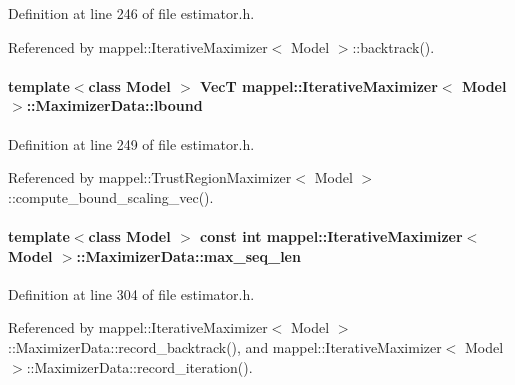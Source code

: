 Definition at line 246 of file estimator.\+h.



Referenced by mappel\+::\+Iterative\+Maximizer$<$ Model $>$\+::backtrack().

\paragraph[{\texorpdfstring{lbound}{lbound}}]{\setlength{\rightskip}{0pt plus 5cm}template$<$class Model $>$ {\bf VecT} {\bf mappel\+::\+Iterative\+Maximizer}$<$ Model $>$\+::Maximizer\+Data\+::lbound}\hypertarget{classmappel_1_1IterativeMaximizer_1_1MaximizerData_aead80fc0e12236ca355849ad36749094}{}\label{classmappel_1_1IterativeMaximizer_1_1MaximizerData_aead80fc0e12236ca355849ad36749094}


Definition at line 249 of file estimator.\+h.



Referenced by mappel\+::\+Trust\+Region\+Maximizer$<$ Model $>$\+::compute\+\_\+bound\+\_\+scaling\+\_\+vec().

\paragraph[{\texorpdfstring{max\+\_\+seq\+\_\+len}{max_seq_len}}]{\setlength{\rightskip}{0pt plus 5cm}template$<$class Model $>$ const int {\bf mappel\+::\+Iterative\+Maximizer}$<$ Model $>$\+::Maximizer\+Data\+::max\+\_\+seq\+\_\+len\hspace{0.3cm}{\ttfamily [protected]}}\hypertarget{classmappel_1_1IterativeMaximizer_1_1MaximizerData_aee106ddaebe30496f5280095fc01301a}{}\label{classmappel_1_1IterativeMaximizer_1_1MaximizerData_aee106ddaebe30496f5280095fc01301a}


Definition at line 304 of file estimator.\+h.



Referenced by mappel\+::\+Iterative\+Maximizer$<$ Model $>$\+::\+Maximizer\+Data\+::record\+\_\+backtrack(), and mappel\+::\+Iterative\+Maximizer$<$ Model $>$\+::\+Maximizer\+Data\+::record\+\_\+iteration().

